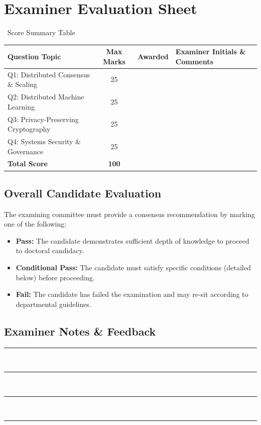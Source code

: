 \section*{Examiner Evaluation Sheet}

\begin{gradebox}{\faCheckDouble\ Score Summary Table}
  \centering\medskip
  \begin{tabularx}{\textwidth}{l c c X}
    \toprule
    \textbf{Question Topic} & \textbf{Max Marks} & \textbf{Awarded} & \textbf{Examiner Initials \& Comments} \\
    \midrule
    Q1: Distributed Consensus \& Scaling & 25 & & \\
    Q2: Distributed Machine Learning & 25 & & \\
    Q3: Privacy-Preserving Cryptography & 25 & & \\
    Q4: Systems Security \& Governance & 25 & & \\
    \midrule
    \textbf{Total Score} & \textbf{100} & & \\
    \bottomrule
  \end{tabularx}
\end{gradebox}

\vspace{1.0cm}

\subsection*{Overall Candidate Evaluation}
The examining committee must provide a consensus recommendation by marking one of the following:

\begin{itemize}[label={$\square$}]
  \item \textbf{Pass:} The candidate demonstrates sufficient depth of knowledge to proceed to doctoral candidacy.
  \item \textbf{Conditional Pass:} The candidate must satisfy specific conditions (detailed below) before proceeding.
  \item \textbf{Fail:} The candidate has failed the examination and may re-sit according to departmental guidelines.
\end{itemize}

\vspace{1.0cm}

\subsection*{Examiner Notes \& Feedback}
\noindent\begin{minipage}{\textwidth}
  \rule{\textwidth}{0.5pt}\\[0.4cm]
  \rule{\textwidth}{0.5pt}\\[0.4cm]
  \rule{\textwidth}{0.5pt}\\[0.4cm]
  \rule{\textwidth}{0.5pt}
\end{minipage}

